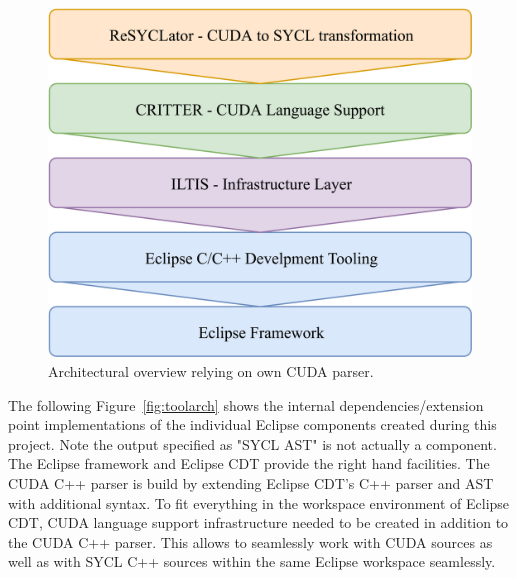 \documentclass[sigconf]{acmart}
\begin{document}
\begin{figure}[h]
  \centering
  \includegraphics[width=\linewidth]{SimpleArchitectureCRITTER}
  \caption{Architectural overview relying on own CUDA parser.}
  \label{fig:resultarch}
\end{figure}

The following Figure~\ref{fig:toolarch} shows the internal dependencies/extension point implementations of the individual Eclipse components created during this project. Note the output specified as "SYCL AST" is not actually a component. The Eclipse framework and Eclipse CDT provide the right hand facilities. The CUDA C++ parser is build by extending Eclipse CDT's C++ parser and AST with additional syntax. To fit everything in the workspace environment of Eclipse CDT, CUDA language support infrastructure needed to be created in addition to the CUDA C++ parser. This allows to seamlessly work with CUDA sources as well as with SYCL C++ sources within the same Eclipse workspace seamlessly.
\end{document}
